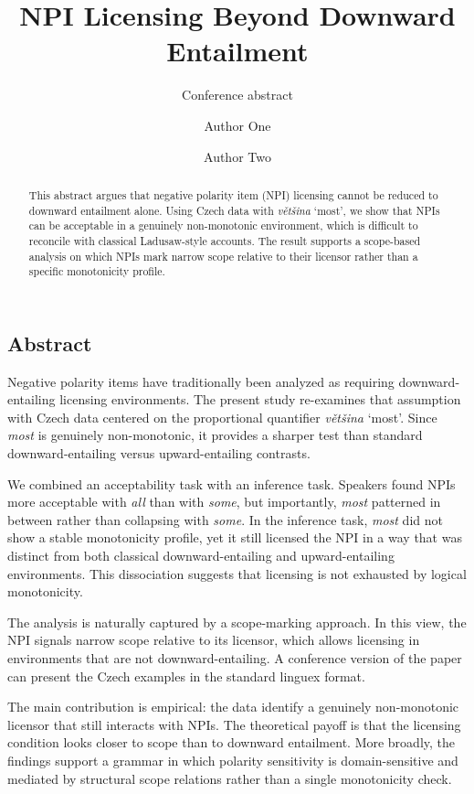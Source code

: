 \documentclass[
  11pt,
  a4paper,
]{article}
\title{NPI Licensing Beyond Downward Entailment}
\subtitle{Conference abstract}
\author{Author One \and Author Two}
\date{}
\begin{document}
\maketitle
\begin{abstract}
This abstract argues that negative polarity item (NPI) licensing cannot
be reduced to downward entailment alone. Using Czech data with
\emph{většina} `most', we show that NPIs can be acceptable in a
genuinely non-monotonic environment, which is difficult to reconcile
with classical Ladusaw-style accounts. The result supports a scope-based
analysis on which NPIs mark narrow scope relative to their licensor
rather than a specific monotonicity profile.
\end{abstract}


\subsection{Abstract}\label{abstract}

Negative polarity items have traditionally been analyzed as requiring
downward-entailing licensing environments. The present study re-examines
that assumption with Czech data centered on the proportional quantifier
\emph{většina} `most'. Since \emph{most} is genuinely non-monotonic, it
provides a sharper test than standard downward-entailing versus
upward-entailing contrasts.

We combined an acceptability task with an inference task. Speakers found
NPIs more acceptable with \emph{all} than with \emph{some}, but
importantly, \emph{most} patterned in between rather than collapsing
with \emph{some}. In the inference task, \emph{most} did not show a
stable monotonicity profile, yet it still licensed the NPI in a way that
was distinct from both classical downward-entailing and upward-entailing
environments. This dissociation suggests that licensing is not exhausted
by logical monotonicity.

The analysis is naturally captured by a scope-marking approach. In this
view, the NPI signals narrow scope relative to its licensor, which
allows licensing in environments that are not downward-entailing. A
conference version of the paper can present the Czech examples in the
standard linguex format.

The main contribution is empirical: the data identify a genuinely
non-monotonic licensor that still interacts with NPIs. The theoretical
payoff is that the licensing condition looks closer to scope than to
downward entailment. More broadly, the findings support a grammar in
which polarity sensitivity is domain-sensitive and mediated by
structural scope relations rather than a single monotonicity check.
\end{document}
